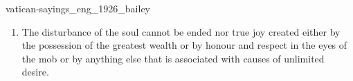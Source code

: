 \documentclass{stex}
\begin{document}
\begin{smodule}{vatican-sayings_eng_1926_bailey}
\begin{sparagraph}[id=vatican-sayings,name={Vatican Sayings}]
\begin{enumerate}[listparindent=0cm]
    \item\begin{sparagraph}[id=saying:81,name=Vatican Saying 81]
      The disturbance of the soul cannot be ended nor true joy created either by the possession of the greatest wealth or by honour and respect in the eyes of the mob or by anything else that is associated with causes of unlimited desire.
    \end{sparagraph}
  \end{enumerate}
\end{sparagraph}
\end{smodule}
\end{document}
